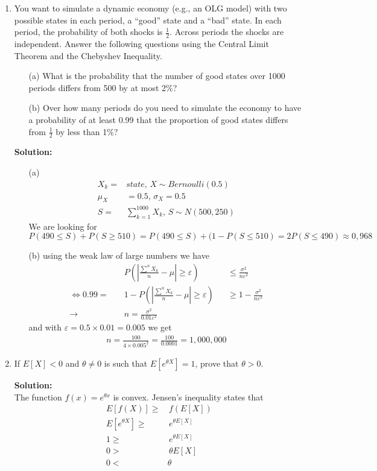 \documentclass[letterpaper,12pt]{article}
\theoremstyle{definition}
\begin{document}
\begin{enumerate}
	\item You want to simulate a dynamic economy (e.g., an OLG model) with two possible states in each period, a ``good'' state and a ``bad'' state. In each period, the probability of both shocks is $\frac{1}{2}$. Across periods the shocks are independent. Answer the following questions using the Central Limit Theorem and the Chebyshev Inequality.
		\begin{itemize}
			\item[(a)] What is the probability that the number of good states over 1000 periods differs from 500 by at most 2\%?
			\item[(b)] Over how many periods do you need to simulate the economy to have a probability of at least 0.99 that the proportion of good states differs from $\frac{1}{2}$ by less than 1\%?
		\end{itemize}
\textbf{Solution:}
\begin{itemize}
\item[(a)] \begin{align*} 
X_k=&state, \, X \sim Bernoulli(0.5)\\
\mu_X&=0.5, \, \sigma_X=0.5\\
S =& \sum^{1000}_{k=1} X_k, \,
S \sim N(500, 250)
\end{align*}
We are looking for $P(490 \leq S)+P(S \geq 510)= P(490 \leq S) +(1-P(S \leq 510) = 2P(S \leq 490) \approx 0,968
$ 


\item[(b)] using the weak law of large numbers we have \begin{align*}
&P\left(|\frac{\sum^n X_k}{n} -\mu| \geq \varepsilon \right)  &&\leq \frac{\sigma^2}{n \varepsilon^2} \\
\Leftrightarrow 0.99 = \quad &1-P\left(|\frac{\sum^n X_k}{n} -\mu| \geq \varepsilon \right) &&\geq 1 - \frac{\sigma^2}{n \varepsilon^2} \\
\rightarrow \quad &n=\frac{\sigma^2}{0.01\varepsilon^2}
\end{align*}
and with $\varepsilon= 0.5 \times 0.01= 0.005$ we get
\begin{align*}
n = \frac{100}{4 \times 0.005^2} = \frac{100}{0.0001} = 1,000,000
\end{align*}
\end{itemize}
	\item If $E[X]<0$ and $\theta \neq 0$ is such that $E[e^{\theta X}]=1$, prove that $\theta > 0$.
	
\textbf{Solution:}\\
The function $f(x) = e^{\theta x}$ is convex. Jensen's inequality states that 
\begin{align*}
E[f(X)] \geq& \, f(E[X]) \\ 
E[e^{\theta X}]\geq& \,  e^{\theta E[X]} \\
1\geq& \,  e^{\theta E[X]}\\
 0 > & \,  \theta E[X] \\
0 < &\theta
\end{align*}
\end{enumerate}

\vspace{25mm}


\end{document}
